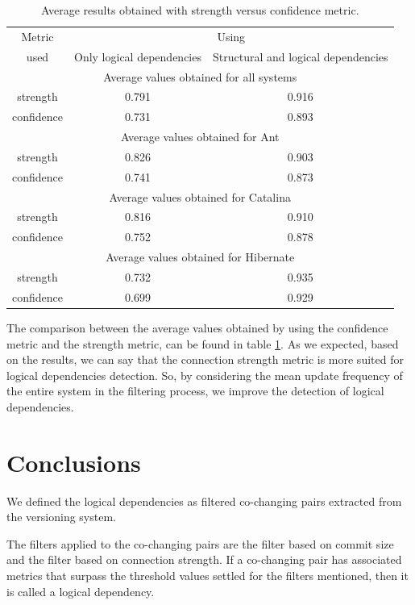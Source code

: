 \documentclass[runningheads]{comsis2}
\begin{document}
\begin{table}[!h]
\setlength\tabcolsep{3.5pt}
\caption{ Average results obtained with strength versus confidence metric.}
\label{tab:confidence_vs_strength}
\centering
\begin{tabular}{|c|c|c|}
\hline
Metric  &\multicolumn{2}{c|}{Using}\\
 used &Only logical dependencies 	&	Structural and logical dependencies 	 \\
\hline
\multicolumn{3}{|c|}{Average values obtained for all systems}\\
\hline
strength	&	0.791	&	0.916	\\
confidence	&	0.731	&	0.893	\\
\hline
\multicolumn{3}{|c|}{Average values obtained for Ant}\\
\hline
strength	&	0.826	&	0.903	\\
confidence	&	0.741	&	0.873	\\
\hline
\multicolumn{3}{|c|}{Average values obtained for Catalina}\\
\hline
strength	&	0.816	&	0.910	\\
confidence	&	0.752	&	0.878	\\
\hline
\multicolumn{3}{|c|}{Average values obtained for Hibernate}\\
\hline
strength	&	0.732	&	0.935	\\
confidence	&	0.699	&	0.929	\\

\hline
\end{tabular}
\end{table}

The comparison between the average values obtained by using the confidence metric and the strength metric, can be found in table \ref{tab:confidence_vs_strength}.
As we expected, based on the results, we can say that the connection strength metric is more suited for logical dependencies detection. So, by considering the mean update frequency of the entire system in the filtering process, we improve the detection of logical dependencies.



\section{Conclusions}
\label{sec:conclusion}


We defined the logical dependencies as filtered co-changing pairs extracted from the versioning system. 

The filters applied to the co-changing pairs are the filter based on commit size and the filter based on connection strength. If a co-changing pair has associated metrics that surpass the threshold values settled for the filters mentioned, then it is called a logical dependency.
\end{document}
